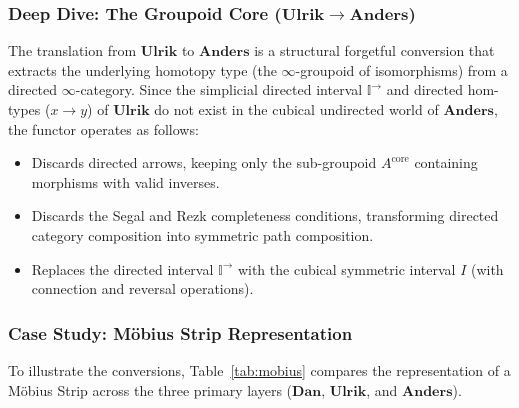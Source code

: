 \documentclass{article}
\theoremstyle{definition}
\theoremstyle{plain}
\begin{document}
\subsubsection{Deep Dive: The Groupoid Core (\texorpdfstring{$\mathbf{Ulrik} \to \mathbf{Anders}$}{Ulrik -> Anders})}
The translation from $\mathbf{Ulrik}$ to $\mathbf{Anders}$ is a structural forgetful conversion that extracts the underlying homotopy type (the $\infty$-groupoid of isomorphisms) from a directed $\infty$-category. Since the simplicial directed interval $\mathbb{I}^{\to}$ and directed hom-types ($x \to y$) of $\mathbf{Ulrik}$ do not exist in the cubical undirected world of $\mathbf{Anders}$, the functor operates as follows:
\begin{itemize}
    \item Discards directed arrows, keeping only the sub-groupoid $A^{\mathrm{core}}$ containing morphisms with valid inverses.
    \item Discards the Segal and Rezk completeness conditions, transforming directed category composition into symmetric path composition.
    \item Replaces the directed interval $\mathbb{I}^{\to}$ with the cubical symmetric interval $I$ (with connection and reversal operations).
\end{itemize}

\newpage
\subsubsection{Case Study: M\"obius Strip Representation}
To illustrate the conversions, Table~\ref{tab:mobius} compares the representation of a M\"obius Strip across the three primary layers ($\mathbf{Dan}$, $\mathbf{Ulrik}$, and $\mathbf{Anders}$).
\end{document}
